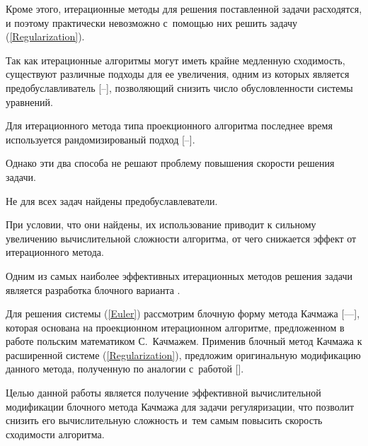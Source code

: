 Кроме этого, итерационные методы для решения поставленной задачи расходятся, и поэтому практически невозможно с~помощью них решить задачу (\ref{Regularization}).



Так как итерационные алгоритмы могут иметь крайне медленную сходимость, существуют различные подходы для ее увеличения, одним из которых является предобуславливатель [--], позволяющий снизить число обусловленности системы уравнений. 

Для итерационного метода типа проекционного алгоритма последнее время используется рандомизированый подход [--]. 

Однако эти два способа не решают проблему повышения скорости решения задачи. 

Не для всех задач найдены предобуславлеватели. 

При условии, что они найдены, их использование приводит к сильному увеличению вычислительной сложности алгоритма, от чего  снижается эффект от итерационного метода.



Одним из самых наиболее эффективных итерационных методов решения задачи является разработка блочного варианта \cite{Ivanov}.







Для решения системы (\ref{Euler}) рассмотрим блочную форму метода Качмажа [—], которая основана на проекционном итерационном алгоритме, предложенном в работе \cite{Kaczmarz} польским математиком С.~Качмажем. Применив блочный метод Качмажа к расширенной системе (\ref{Regularization}), предложим оригинальную модификацию данного метода, полученную по аналогии с~работой []. 









Целью данной работы является получение эффективной вычислительной модификации блочного метода Качмажа для задачи регуляризации, что позволит снизить его вычислительную сложность и~тем самым повысить скорость сходимости алгоритма.



